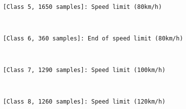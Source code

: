 \documentclass[11pt]{article}
\begin{document}
    \begin{center}
    \end{center}
    { \hspace*{\fill} \\}
    
    \begin{Verbatim}[commandchars=\\\{\}]
[Class 5, 1650 samples]: Speed limit (80km/h)

    \end{Verbatim}

    \begin{center}
    \end{center}
    { \hspace*{\fill} \\}
    
    \begin{Verbatim}[commandchars=\\\{\}]
[Class 6, 360 samples]: End of speed limit (80km/h)

    \end{Verbatim}

    \begin{center}
    \end{center}
    { \hspace*{\fill} \\}
    
    \begin{Verbatim}[commandchars=\\\{\}]
[Class 7, 1290 samples]: Speed limit (100km/h)

    \end{Verbatim}

    \begin{center}
    \end{center}
    { \hspace*{\fill} \\}
    
    \begin{Verbatim}[commandchars=\\\{\}]
[Class 8, 1260 samples]: Speed limit (120km/h)

    \end{Verbatim}
\end{document}
